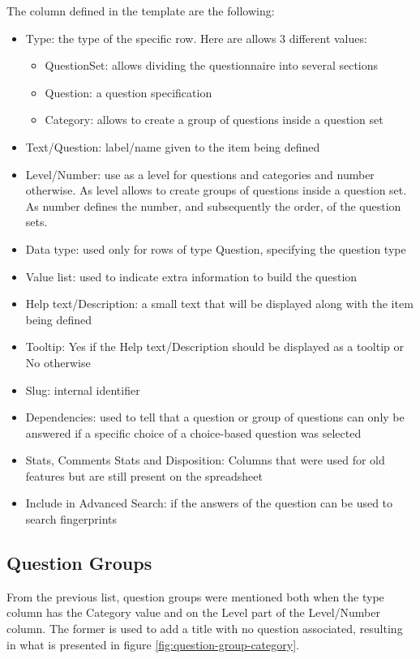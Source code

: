 The column defined in the template are the following:
\begin{itemize}
    \item Type: the type of the specific row. Here are allows 3 different values:
        \begin{itemize}
            \item QuestionSet: allows dividing the questionnaire into several sections
            \item Question: a question specification
            \item Category: allows to create a group of questions inside a question set
        \end{itemize}
    \item Text/Question: label/name given to the item being defined
    \item Level/Number: use as a level for questions and categories and number otherwise. As level allows to create groups of questions inside a question set. As number defines the number, and subsequently the order, of the question sets.
    \item Data type: used only for rows of type Question, specifying the question type
    \item Value list: used to indicate extra information to build the question
    \item Help text/Description: a small text that will be displayed along with the item being defined
    \item Tooltip: Yes if the Help text/Description should be displayed as a tooltip or No otherwise
    \item Slug: internal identifier
    \item Dependencies: used to tell that a question or group of questions can only be answered if a specific choice of a choice-based question was selected
    \item Stats, Comments Stats and Disposition: Columns that were used for old features but are still present on the spreadsheet
    \item Include in Advanced Search: if the answers of the question can be used to search fingerprints
\end{itemize}

\subsection*{Question Groups}
From the previous list, question groups were mentioned both when the type column has the Category value and on the Level part of the Level/Number column.
The former is used to add a title with no question associated, resulting in what is presented in figure \ref{fig:question-group-category}.

